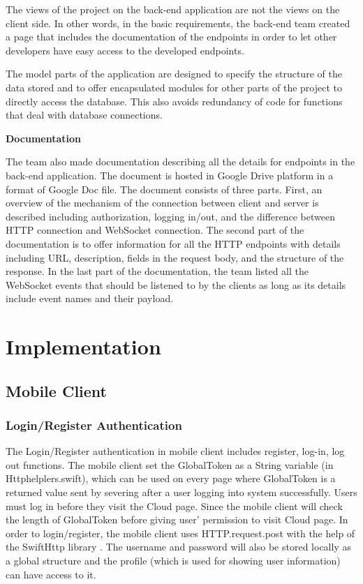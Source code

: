 \documentclass{article}
\begin{document}
The views of the project on the back-end application are not the views on the client side. In other words, in the basic requirements, the back-end team created a page that includes the documentation of the endpoints in order to let other developers have easy access to the developed endpoints.  

The model parts of the application are designed to specify the structure of the data stored and to offer encapsulated modules for other parts of the project to directly access the database. This also avoids redundancy of code for functions that deal with database connections.

\newline
\textbf{Documentation}

The team also made documentation describing all the details for endpoints in the back-end application. The document is hosted in Google Drive platform in a format of Google Doc file. The document consists of three parts. First, an overview of the mechanism of the connection between client and server is described including authorization, logging in/out, and the difference between HTTP connection and WebSocket connection. The second part of the documentation is to offer information for all the HTTP endpoints with details including URL, description, fields in the request body, and the structure of the response. In the last part of the documentation, the team listed all the WebSocket events that should be listened to by the clients as long as its details include event names and their payload.

\newpage
\section{Implementation}
\subsection{Mobile Client}
\subsubsection{Login/Register Authentication}

The Login/Register authentication in mobile client includes register, log-in, log out functions. The mobile client set the GlobalToken as a String variable (in Httphelplers.swift), which can be used on every page where GlobalToken is a returned value sent by severing after a user logging into system successfully. Users must log in before they visit the Cloud page. Since the mobile client will check the length of GlobalToken before giving user' permission to visit Cloud page. In order to login/register, the mobile client uses HTTP.request.post with the help of the SwiftHttp library \cite{c11}. The username and password will also be stored locally as a global structure and the profile (which is used for showing user information) can have access to it.
\end{document}
